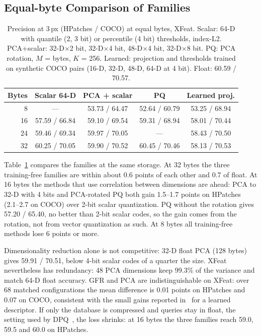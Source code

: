 \documentclass[10pt,conference]{IEEEtran}
\begin{document}
\subsection{Equal-byte Comparison of Families}\label{sec:families}
\begin{table}[t]
\caption{Precision at 3\,px (HPatches / COCO) at equal bytes, XFeat. Scalar: 64-D with quantile (2, 3 bit) or percentile (4 bit) thresholds, index-L2. PCA+scalar: 32-D$\times$2 bit, 32-D$\times$4 bit, 48-D$\times$4 bit, 32-D$\times$8 bit. PQ: PCA rotation, $M$ = bytes, $K$ = 256. Learned: projection and thresholds trained on synthetic COCO pairs (16-D, 32-D, 48-D, 64-D at 4 bit). Float: 60.59 / 70.57.}
\label{tab:families}
\centering\footnotesize
\setlength{\tabcolsep}{3.5pt}
\begin{tabular}{@{}rcccc@{}}
\toprule
Bytes & Scalar 64-D & PCA + scalar & PQ & Learned proj.\\
\midrule
8 & --- & 53.73 / 64.47 & 52.64 / 60.79 & 53.25 / 68.94\\
16 & 57.59 / 66.84 & 59.10 / 69.54 & 59.31 / 68.94 & 58.01 / 70.44\\
24 & 59.46 / 69.34 & 59.97 / 70.05 & --- & 58.43 / 70.50\\
32 & 60.25 / 70.05 & 59.90 / 70.52 & 60.45 / 70.46 & 58.13 / 70.53\\
\bottomrule
\end{tabular}
\end{table}
Table~\ref{tab:families} compares the families at the same storage. At 32 bytes the three training-free families are within about 0.6 points of each other and 0.7 of float. At 16 bytes the methods that use correlation between dimensions are ahead: PCA to 32-D with 4 bits and PCA-rotated PQ both gain 1.5--1.7 points on HPatches (2.1--2.7 on COCO) over 2-bit scalar quantization. PQ without the rotation gives 57.20 / 65.40, no better than 2-bit scalar codes, so the gain comes from the rotation, not from vector quantization as such. At 8 bytes all training-free methods lose 6 points or more.

Dimensionality reduction alone is not competitive: 32-D float PCA (128 bytes) gives 59.91 / 70.51, below 4-bit scalar codes of a quarter the size. XFeat nevertheless has redundancy: 48 PCA dimensions keep 99.3\% of the variance and match 64-D float accuracy. GFR and PCA are indistinguishable on XFeat: over 68 matched configurations the mean difference is 0.01 points on HPatches and 0.07 on COCO, consistent with the small gains reported in~\cite{gfr} for a learned descriptor. If only the database is compressed and queries stay in float, the setting used by DPQ~\cite{dpq}, the loss shrinks: at 16 bytes the three families reach 59.0, 59.5 and 60.0 on HPatches.
\end{document}
